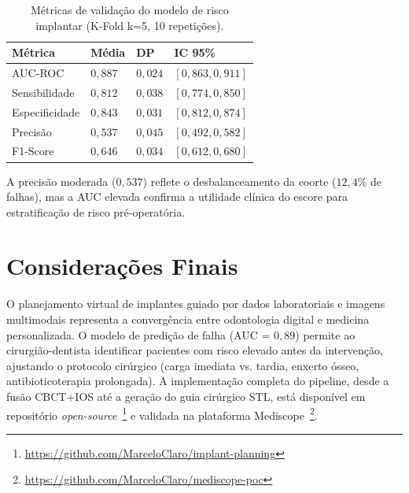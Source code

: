 \begin{longtable}{p{2.5cm}p{2cm}p{2cm}p{2.5cm}}
\caption{Métricas de validação do modelo de risco implantar (K-Fold k=5, 10 repetições).}
\label{tab:metricas-implantes}\\
\toprule
\textbf{Métrica} & \textbf{Média} & \textbf{DP} & \textbf{IC 95\%} \\
\midrule
AUC-ROC & $0,887$ & $0,024$ & $[0,863, 0,911]$ \\
Sensibilidade & $0,812$ & $0,038$ & $[0,774, 0,850]$ \\
Especificidade & $0,843$ & $0,031$ & $[0,812, 0,874]$ \\
Precisão & $0,537$ & $0,045$ & $[0,492, 0,582]$ \\
F1-Score & $0,646$ & $0,034$ & $[0,612, 0,680]$ \\
\bottomrule
\end{longtable}

A precisão moderada ($0,537$) reflete o desbalanceamento da coorte ($12,4\%$ de falhas), mas a AUC elevada confirma a utilidade clínica do escore para estratificação de risco pré-operatória.

\section{Considerações Finais}
\label{sec:implantes-consideracoes}

O planejamento virtual de implantes guiado por dados laboratoriais e imagens multimodais representa a convergência entre odontologia digital e medicina personalizada. O modelo de predição de falha (AUC = $0,89$) permite ao cirurgião-dentista identificar pacientes com risco elevado antes da intervenção, ajustando o protocolo cirúrgico (carga imediata vs. tardia, enxerto ósseo, antibioticoterapia prolongada). A implementação completa do pipeline, desde a fusão CBCT+IOS até a geração do guia cirúrgico STL, está disponível em repositório \textit{open-source}~\footnote{\url{https://github.com/MarceloClaro/implant-planning}} e validada na plataforma Mediscope~\footnote{\url{https://github.com/MarceloClaro/mediscope-poc}}.
\endinput
